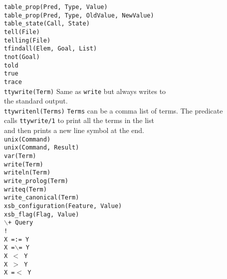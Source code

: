 \begin{tabbing}
 \> {\tt table\_prop(Pred, Type, Value)} \>				\\
 \> {\tt table\_prop(Pred, Type, OldValue, NewValue)} \>		\\
 \> {\tt table\_state(Call, State)} \>					\\
 \> {\tt tell(File)}		\>					\\
 \> {\tt telling(File)}		\>					\\
 \> {\tt tfindall(Elem, Goal, List)} \>					\\
 \> {\tt tnot(Goal)}		\>					\\
 \> {\tt told}			\>					\\
 \> {\tt true}			\>					\\
 \> {\tt trace}			\>					\\
 \> {\tt ttywrite(Term)}	\> Same as {\tt write} but always writes to \\
 \>				\> the standard output.			\\
 \> {\tt ttywritenl(Terms)}	\>
		{\tt Terms} can be a comma list of terms. The predicate	\\
 \>	\>	calls {\tt ttywrite/1} to print all the terms in the list \\
 \>	\>	and then prints a new line symbol at the end.		\\
 \> {\tt unix(Command)}		\>					\\
 \> {\tt unix(Command, Result)}	\>					\\
 \> {\tt var(Term)}		\>					\\
 \> {\tt write(Term)}		\>					\\
 \> {\tt writeln(Term)}		\>					\\
 \> {\tt write\_prolog(Term)}	\>					\\
 \> {\tt writeq(Term)}		\>					\\
 \> {\tt write\_canonical(Term)} \>					\\
 \> {\tt xsb\_configuration(Feature, Value)} \>				\\
 \> {\tt xsb\_flag(Flag, Value)} \>					\\
 \> {\tt $\backslash$+ Query}	\>					\\
 \> {\tt !}			\>					\\
 \> {\tt X =:= Y}		\>					\\
 \> {\tt X =$\backslash$= Y}	\>					\\
 \> {\tt X $<$ Y}		\>					\\
 \> {\tt X $>$ Y}		\>					\\
 \> {\tt X =$<$ Y}		\>					\\

\end{tabbing}
